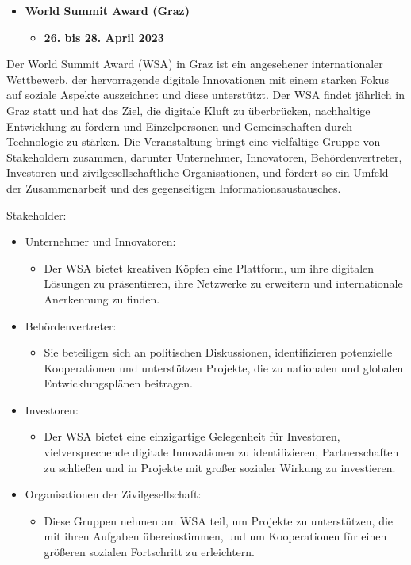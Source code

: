 \begin{itemize}
    \item \textbf{World Summit Award (Graz)}
          \begin{itemize}
              \item \textbf{26. bis 28. April 2023}
          \end{itemize}
\end{itemize}

Der World Summit Award (WSA) in Graz ist ein angesehener internationaler Wettbewerb, der hervorragende digitale Innovationen mit einem starken Fokus auf soziale Aspekte auszeichnet und diese unterstützt. Der WSA findet jährlich in Graz statt und hat das Ziel, die digitale Kluft zu überbrücken, nachhaltige Entwicklung zu fördern und Einzelpersonen und Gemeinschaften durch Technologie zu stärken. Die Veranstaltung bringt eine vielfältige Gruppe von Stakeholdern zusammen, darunter Unternehmer, Innovatoren, Behördenvertreter, Investoren und zivilgesellschaftliche Organisationen, und fördert so ein Umfeld der Zusammenarbeit und des gegenseitigen Informationsaustausches.

Stakeholder:

\begin{itemize}
    \item {Unternehmer und Innovatoren:}
          \begin{itemize}
              \item {Der WSA bietet kreativen Köpfen eine Plattform, um ihre digitalen Lösungen zu präsentieren, ihre Netzwerke zu erweitern und internationale Anerkennung zu finden.}
          \end{itemize}
    \item {Behördenvertreter:}
          \begin{itemize}
              \item {Sie beteiligen sich an politischen Diskussionen, identifizieren potenzielle Kooperationen und unterstützen Projekte, die zu nationalen und globalen Entwicklungsplänen beitragen.}
          \end{itemize}
    \item {Investoren:}
          \begin{itemize}
              \item {Der WSA bietet eine einzigartige Gelegenheit für Investoren, vielversprechende digitale Innovationen zu identifizieren, Partnerschaften zu schließen und in Projekte mit großer sozialer Wirkung zu investieren.}
          \end{itemize}
    \item {Organisationen der Zivilgesellschaft:}
          \begin{itemize}
              \item {Diese Gruppen nehmen am WSA teil, um Projekte zu unterstützen, die mit ihren Aufgaben übereinstimmen, und um Kooperationen für einen größeren sozialen Fortschritt zu erleichtern.}
          \end{itemize}
\end{itemize}

